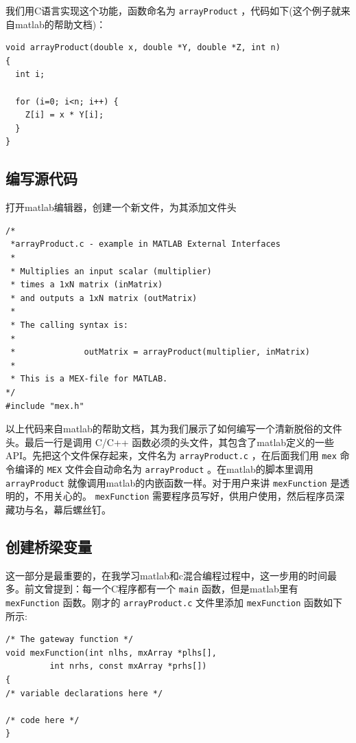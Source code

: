 \documentclass[10pt,a4paper,UTF8]{article}
\begin{document}
我们用C语言实现这个功能，函数命名为 \texttt{arrayProduct} ，代码如下(这个例子就来自matlab的帮助文档)：
\lstset{language=C,label= ,caption= ,captionpos=b,numbers=left}
\begin{lstlisting}
void arrayProduct(double x, double *Y, double *Z, int n)
{
  int i;

  for (i=0; i<n; i++) {
    Z[i] = x * Y[i];
  }
}
\end{lstlisting}
\subsection{编写源代码}
\label{sec:orgheadline3}


打开matlab编辑器，创建一个新文件，为其添加文件头
\lstset{language=C,label= ,caption= ,captionpos=b,numbers=none}
\begin{lstlisting}
/*
 *arrayProduct.c - example in MATLAB External Interfaces
 *
 * Multiplies an input scalar (multiplier)
 * times a 1xN matrix (inMatrix)
 * and outputs a 1xN matrix (outMatrix)
 *
 * The calling syntax is:
 *
 *              outMatrix = arrayProduct(multiplier, inMatrix)
 *
 * This is a MEX-file for MATLAB.
*/
#include "mex.h"
\end{lstlisting}
以上代码来自matlab的帮助文档，其为我们展示了如何编写一个清新脱俗的文件头。最后一行是调用 C/C++ 函数必须的头文件，其包含了matlab定义的一些API。先把这个文件保存起来，文件名为 \texttt{arrayProduct.c} ，在后面我们用 \texttt{mex} 命令编译的 \texttt{MEX} 文件会自动命名为 \texttt{arrayProduct} 。在matlab的脚本里调用 \texttt{arrayProduct} 就像调用matlab的内嵌函数一样。对于用户来讲 \texttt{mexFunction} 是透明的，不用关心的。 \texttt{mexFunction} 需要程序员写好，供用户使用，然后程序员深藏功与名，幕后螺丝钉。
\subsection{创建桥梁变量\label{orgtarget1}}
\label{sec:orgheadline4}


这一部分是最重要的，在我学习matlab和c混合编程过程中，这一步用的时间最多。前文曾提到：每一个C程序都有一个 \texttt{main} 函数，但是matlab里有 \texttt{mexFunction} 函数。刚才的 \texttt{arrayProduct.c} 文件里添加 \texttt{mexFunction} 函数如下所示:
\lstset{language=C,label= ,caption= ,captionpos=b,numbers=none}
\begin{lstlisting}
/* The gateway function */
void mexFunction(int nlhs, mxArray *plhs[],
		 int nrhs, const mxArray *prhs[])
{
/* variable declarations here */

/* code here */
}
\end{lstlisting}
\end{document}

